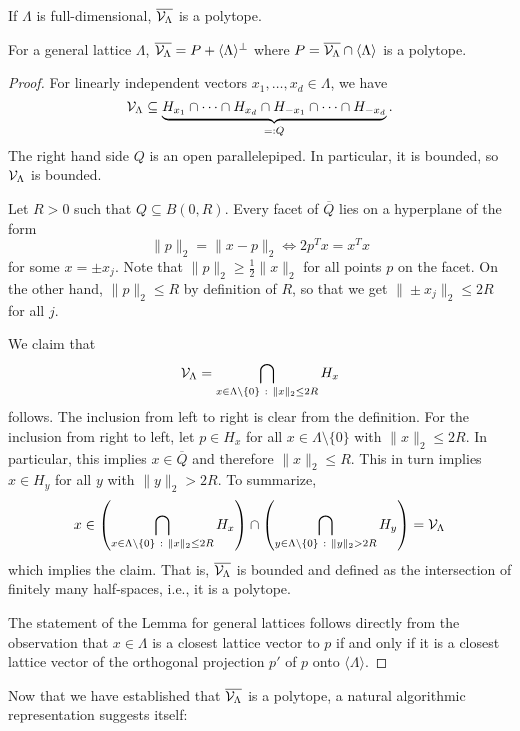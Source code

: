 \begin{lemma}
  If $\Lambda$ is full-dimensional, $\overline{\mathcal{V}_\Lambda}$ is a polytope.

  For a general lattice $\Lambda$,
  $\overline{\mathcal{V}_\Lambda} = P + \langle \Lambda \rangle^\bot$
  where $P = \overline{\mathcal{V}_\Lambda} \cap \langle \Lambda \rangle$ is a polytope.
\end{lemma}
\begin{proof}
  For linearly independent vectors $x_1, \ldots, x_d \in \Lambda$,
  we have
  \[
    \mathcal{V}_\Lambda \subseteq
      \underbrace{H_{x_1} \cap \dots \cap H_{x_d} \cap H_{-x_1} \cap \dots \cap H_{-x_d}}_{=: Q}.
  \]
  The right hand side $Q$ is an open parallelepiped.
  In particular, it is bounded, so $\mathcal{V}_\Lambda$ is bounded.

  Let $R > 0$ such that $Q \subseteq B(0,R)$.
  Every facet of $\overline{Q}$ lies on a hyperplane of the form
  \[
    \|p\|_2 = \|x - p\|_2 \iff 2p^Tx = x^Tx
  \]
  for some $x = \pm x_j$.
  Note that $\|p\|_2 \geq \frac{1}{2} \|x\|_2$ for all points $p$ on the facet.
  On the other hand, $\|p\|_2 \leq R$ by definition of $R$,
  so that we get $\|\pm x_j\|_2 \leq 2R$ for all $j$.

  We claim that
  \[
    \mathcal{V}_\Lambda = \bigcap_{x \in \Lambda\setminus\{0\} ~:~ \|x\|_2 \leq 2R} H_x
  \]
  follows.
  The inclusion from left to right is clear from the definition.
  For the inclusion from right to left,
  let $p \in H_x$ for all $x \in \Lambda\setminus\{0\}$ with $\|x\|_2 \leq 2R$.
  In particular, this implies $x \in \overline{Q}$ and therefore $\|x\|_2 \leq R$.
  This in turn implies $x \in H_y$ for all $y$ with $\|y\|_2 > 2R$.
  To summarize,
  \[
     x \in \left( \bigcap_{x \in \Lambda\setminus\{0\} ~:~ \|x\|_2 \leq 2R} H_x \right)
      \cap \left( \bigcap_{y \in \Lambda\setminus\{0\} ~:~ \|y\|_2 > 2R} H_y \right) = \mathcal{V}_\Lambda
  \]
  which implies the claim.
  That is, $\overline{\mathcal{V}_\Lambda}$ is bounded and defined as the intersection of finitely many half-spaces,
  i.e., it is a polytope.

  The statement of the Lemma for general lattices follows
  directly from the observation that $x \in \Lambda$ is a closest lattice vector to $p$
  if and only if it is a closest lattice vector of the orthogonal projection $p'$ of $p$
  onto $\langle \Lambda \rangle$.
\end{proof}

Now that we have established that $\overline{\mathcal{V}_\Lambda}$ is a polytope,
a natural algorithmic representation suggests itself:

